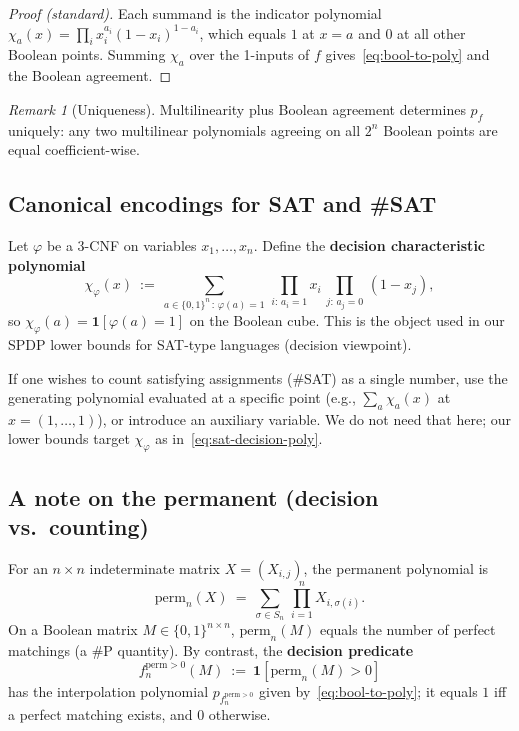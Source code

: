 \documentclass[12pt]{article}
\theoremstyle{definition}
\theoremstyle{definition}
\theoremstyle{remark}
\newtheorem{remark}{Remark}
\theoremstyle{remark}
\begin{document}
\begin{proof}[Proof (standard)]
Each summand is the indicator polynomial $\chi_a(x)=\prod_i x_i^{a_i}(1-x_i)^{1-a_i}$, which equals $1$ at $x=a$ and $0$ at all other Boolean points. Summing $\chi_a$ over the 1-inputs of $f$ gives~\eqref{eq:bool-to-poly} and the Boolean agreement.
\end{proof}

\begin{remark}[Uniqueness]\label{rem:multilinear-uniqueness}
Multilinearity plus Boolean agreement determines $p_f$ uniquely: any two multilinear polynomials agreeing on all $2^n$ Boolean points are equal coefficient-wise.
\end{remark}

\subsection{Canonical encodings for SAT and \#SAT}

Let $\varphi$ be a 3-CNF on variables $x_1,\dots,x_n$. Define the \textbf{decision characteristic polynomial}
\begin{equation}\label{eq:sat-decision-poly}
\chi_\varphi(x)\ :=\ \sum_{a\in\{0,1\}^n\,:\,\varphi(a)=1}\,\prod_{i:\,a_i=1} x_i\,\prod_{j:\,a_j=0}\,(1-x_j),
\end{equation}
so $\chi_\varphi(a)=\mathbf{1}[\varphi(a)=1]$ on the Boolean cube. This is the object used in our SPDP lower bounds for SAT-type languages (decision viewpoint).

If one wishes to count satisfying assignments (\#SAT) as a single number, use the generating polynomial evaluated at a specific point (e.g., $\sum_a \chi_a(x)$ at $x=(1,\dots,1)$), or introduce an auxiliary variable. We do not need that here; our lower bounds target $\chi_\varphi$ as in~\eqref{eq:sat-decision-poly}.

\subsection{A note on the permanent (decision vs.\ counting)}

For an $n\times n$ indeterminate matrix $X=(X_{i,j})$, the permanent polynomial is
\begin{equation}\label{eq:perm-poly}
\mathrm{perm}_n(X)\ =\ \sum_{\sigma\in S_n}\,\prod_{i=1}^n X_{i,\sigma(i)}.
\end{equation}
On a Boolean matrix $M\in\{0,1\}^{n\times n}$, $\mathrm{perm}_n(M)$ equals the number of perfect matchings (a \#P quantity). By contrast, the \textbf{decision predicate}
\[
f_n^{\mathrm{perm}>0}(M)\ :=\ \mathbf{1}[\mathrm{perm}_n(M)>0]
\]
has the interpolation polynomial $p_{f_n^{\mathrm{perm}>0}}$ given by~\eqref{eq:bool-to-poly}; it equals $1$ iff a perfect matching exists, and $0$ otherwise.
\end{document}
